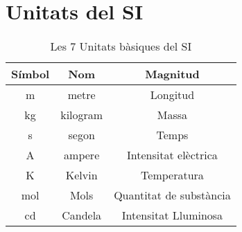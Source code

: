 \section{Unitats del SI}
\label{sec:unitats_del_si}

\begin{table}[H]
    \centering
    \caption{Les 7 Unitats bàsiques del SI}
    \label{tab:si_unitats_basiques}
    \begin{tabular}{ccc}
        \toprule
        Símbol  &   Nom     &   Magnitud \\
        \midrule
        \si{\metre}     & metre     & Longitud \\
        \si{\kilo\gram} & kilogram  & Massa\\
        \si{\second}    & segon     & Temps \\
        \si{\ampere}    & ampere    & Intensitat elèctrica \\
        \si{\kelvin}    & Kelvin    & Temperatura \\
        \si{\mol}       & Mols      & Quantitat de substància\\
        \si{\candela}   & Candela   & Intensitat Lluminosa\\

        \bottomrule

    \end{tabular}
\end{table}

